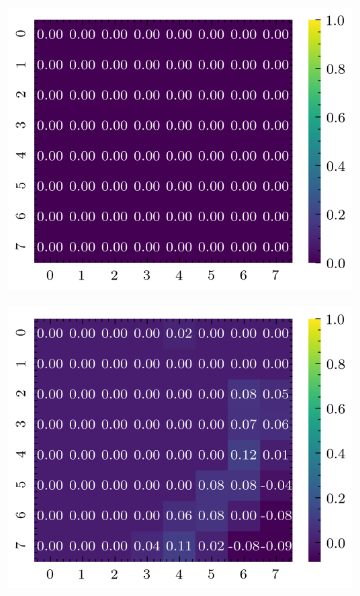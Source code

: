 \documentclass[../document.tex]{subfiles}
\begin{document}
\begin{figure}[H]
    \begin{subfigure}[b]{0.19\textwidth}
        \includegraphics[width=\linewidth]{../img/5/quarry/best/heatmap-2d-0.png}
    \end{subfigure}
    \begin{subfigure}[b]{0.19\textwidth}
        \includegraphics[width=\linewidth]{../img/5/quarry/best/heatmap-2d-1.png}
    \end{subfigure}  
    \begin{subfigure}[b]{0.19\textwidth}

\end{subfigure}
\end{figure}
\end{document}
